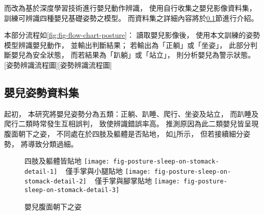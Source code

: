 \documentclass[class=NCU_thesis, crop=false]{standalone}
\begin{document}
而改為基於深度學習技術進行嬰兒動作辨識，
使用自行收集之嬰兒影像資料集，
訓練可辨識四種嬰兒基礎姿勢之模型。
而資料集之詳細內容將於\ref{sec:chapter_method_posture_dataset}節進行介紹。

本部分流程如\cref{fig:fig-flow-chart-posture}：
讀取嬰兒影像後，
使用本文訓練的姿勢模型辨識嬰兒動作，
並輸出判斷結果；
若輸出為「正躺」或「坐姿」，
此部分判斷嬰兒為安全狀態，
而若結果為「趴躺」或「站立」，
則分析嬰兒為警示狀態。
[姿勢辨識流程圖][姿勢辨識流程圖]

\subsection{嬰兒姿勢資料集}
\label{sec:chapter_method_posture_dataset}
起初，
本研究將嬰兒姿勢分為五類：正躺、趴睡、爬行、坐姿及站立，
而趴睡及爬行二類時常發生互相誤判，
致使辨識錯誤率高。
推測原因為此二類嬰兒皆呈現腹面朝下之姿，
不同處在於四肢及軀體是否貼地，
如\cref{fig:fig-posture-sleep-on-stomack-detail}所示，
但若接續細分姿勢，
將導致分類過細。
\begin{figure}[!hbt]
    \centering
    \subcaptionbox
        {四肢及軀體皆貼地
        \label{fig:fig-posture-sleep-on-stomack-detail-1}}
        {\texttt{[image: fig-posture-sleep-on-stomack-detail-1]}}
    ~
    \subcaptionbox
        {僅手掌與小腿貼地
        \label{fig:fig-posture-sleep-on-stomack-detail-2}}
        {\texttt{[image: fig-posture-sleep-on-stomack-detail-2]}}
    ~
    \subcaptionbox
        {僅手掌與腳掌貼地
        \label{fig:fig-posture-sleep-on-stomack-detail-3}}
        {\texttt{[image: fig-posture-sleep-on-stomack-detail-3]}}
    \caption{嬰兒腹面朝下之姿}
    \label{fig:fig-posture-sleep-on-stomack-detail}
\end{figure}
\end{document}
